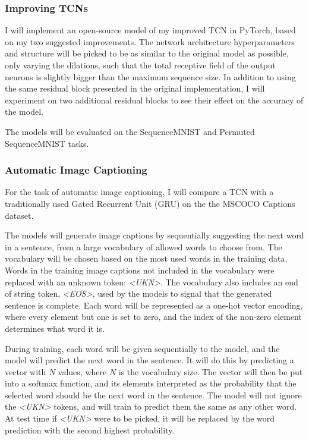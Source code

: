 \documentclass[a4paper, twoside]{article}
\begin{document}
\subsubsection{Improving TCNs}
I will implement an open-source model of my improved TCN in PyTorch, based on my two suggested improvements. The network architecture hyperparameters and structure will be picked to be as similar to the original model as possible, only varying the dilations, such that the total receptive field of the output neurons is slightly bigger than the maximum sequence size. In addition to using the same residual block presented in the original implementation, I will experiment on two additional residual blocks to see their effect on the accuracy of the model.

The models will be evaluated on the SequenceMNIST and Permuted SequenceMNIST tasks.

\subsubsection{Automatic Image Captioning}
For the task of automatic image captioning, I will compare a TCN with a traditionally used Gated Recurrent Unit (GRU) on the the MSCOCO Captions dataset.

The models will generate image captions by sequentially suggesting the next word in a sentence, from a large vocabulary of allowed words to choose from. The vocabulary will be chosen based on the most used words in the training data. Words in the training image captions not included in the vocabulary were replaced with an unknown token: \textit{<UKN>}. The vocabulary also includes an end of string token, \textit{<EOS>}, used by the models to signal that the generated sentence is complete. Each word will be represented as a one-hot vector encoding, where every element but one is set to zero, and the index of the non-zero element determines what word it is.

During training, each word will be given sequentially to the model, and the model will predict the next word in the sentence. It will do this by predicting a vector with $N$ values, where $N$ is the vocabulary size. The vector will then be put into a softmax function, and its elements interpreted as the probability that the selected word should be the next word in the sentence. The model will not ignore the \textit{<UKN>} tokens, and will train to predict them the same as any other word. At test time if \textit{<UKN>} were to be picked, it will be replaced by the word prediction with the second highest probability.
\end{document}
